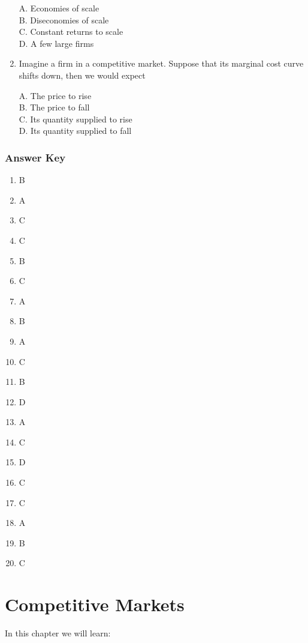 \documentclass[
]{book}
\providecommand{\tightlist}{%
  \setlength{\itemsep}{0pt}\setlength{\parskip}{0pt}}
\begin{document}
\begin{enumerate}
  A. Economies of scale\\
  B. Diseconomies of scale\\
  C. Constant returns to scale\\
  D. A few large firms
\item
  Imagine a firm in a competitive market. Suppose that its marginal cost curve shifts down, then we would expect

  A. The price to rise\\
  B. The price to fall\\
  C. Its quantity supplied to rise\\
  D. Its quantity supplied to fall
\end{enumerate}

\hypertarget{answer-key-4}{%
\subsection{Answer Key}\label{answer-key-4}}

\begin{enumerate}
\def\labelenumi{\arabic{enumi}.}
\tightlist
\item
  B
\item
  A
\item
  C
\item
  C
\item
  B
\item
  C
\item
  A
\item
  B
\item
  A
\item
  C
\item
  B
\item
  D
\item
  A
\item
  C
\item
  D
\item
  C
\item
  C
\item
  A
\item
  B
\item
  C
\end{enumerate}

\hypertarget{competitive-markets}{%
\chapter{Competitive Markets}\label{competitive-markets}}

In this chapter we will learn:
\end{document}
